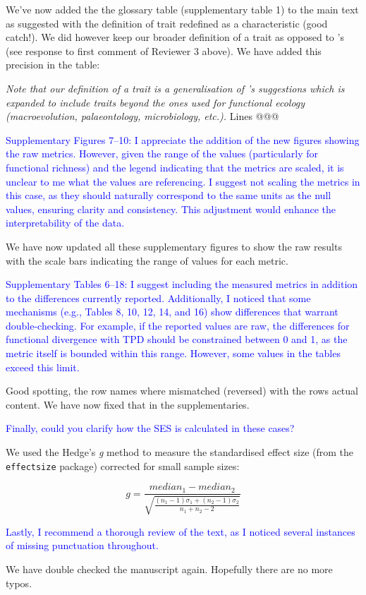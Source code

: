 \documentclass[
]{article}
\begin{document}
We've now added the the glossary table (supplementary table 1) to the main text as suggested with the definition of trait redefined as a characteristic (good catch!).
We did however keep our broader definition of a trait as opposed to \cite{violle2007let}'s (see response to first comment of Reviewer 3 above).
We have added this precision in the table:

\textit{Note that our definition of a trait is a generalisation of \cite{violle2007let,mcgill2006rebuilding,dawson2021traits}'s suggestions which is expanded to include traits beyond the ones used for functional ecology (macroevolution, palaeontology, microbiology, etc.).} Lines @@@

\textcolor{blue}{Supplementary Figures 7–10: I appreciate the addition of the new figures showing the raw metrics.
However, given the range of the values (particularly for functional richness) and the legend indicating that the metrics are scaled, it is unclear to me what the values are referencing.
I suggest not scaling the metrics in this case, as they should naturally correspond to the same units as the null values, ensuring clarity and consistency.
This adjustment would enhance the interpretability of the data.}

We have now updated all these supplementary figures to show the raw results with the scale bars indicating the range of values for each metric.

\textcolor{blue}{Supplementary Tables 6–18: I suggest including the measured metrics in addition to the differences currently reported.
Additionally, I noticed that some mechanisms (e.g., Tables 8, 10, 12, 14, and 16) show differences that warrant double-checking.
For example, if the reported values are raw, the differences for functional divergence with TPD should be constrained between 0 and 1, as the metric itself is bounded within this range.
However, some values in the tables exceed this limit.}

Good spotting, the row names where mismatched (reversed) with the rows actual content.
We have now fixed that in the supplementaries.

\textcolor{blue}{Finally, could you clarify how the SES is calculated in these cases?}

We used the Hedge's \textit{g} method to measure the standardised effect size (from the \texttt{effectsize} package) corrected for small sample sizes:

\begin{equation}
g = \frac{
        median_{1} - median_{2}
      }{
    \sqrt{
      \frac{
           (n_{1}-1)\sigma_{1} + (n_{2}-1)\sigma_{2}
          }{
            n_{1}+n_{2}-2
          }
        }
      }
\end{equation}

\textcolor{blue}{Lastly, I recommend a thorough review of the text, as I noticed several instances of missing punctuation throughout.}

We have double checked the manuscript again.
Hopefully there are no more typos.
\end{document}

